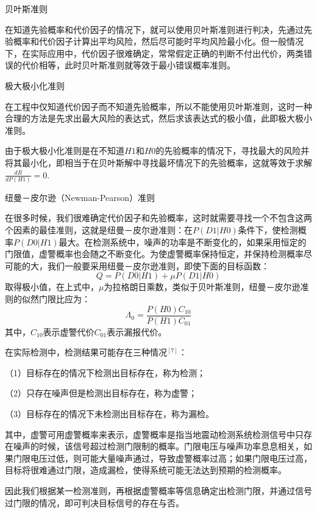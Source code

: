 \documentclass[12pt,a4paper]{article} %
\begin{document}
	\begin{compactitem} 
 			\item 贝叶斯准则
 			\par 在知道先验概率和代价因子的情况下，就可以使用贝叶斯准则进行判决，先通过先验概率和代价因子计算出平均风险，然后尽可能时平均风险最小化。但一般情况下，在实际应用中，代价因子很难确定，常常假定正确的判断不付出代价，两类错误的代价相等，此时贝叶斯准则就等效于最小错误概率准则。
			\item 极大极小化准则
			\par 在工程中仅知道代价因子而不知道先验概率，所以不能使用贝叶斯准则，这时一种合理的方法是先求出最大风险的表达式，然后求该表达式的极小值，此即极大极小准则。
			\par 由于极大极小化准则是在不知道$H1$和$H0$的先验概率的情况下，寻找最大的风险并将其最小化，即相当于在贝叶斯解中寻找最坏情况下的先验概率，这就等效于求解$\frac{dR}{dP(H1)}=0$.
			\item 纽曼－皮尔逊（Newman-Pearson）准则
			\par 在很多时候，我们很难确定代价因子和先验概率，这时就需要寻找一个不包含这两个因素的最佳准则，这就是纽曼－皮尔逊准则：在$P(D1|H0)$条件下，使检测概率$P(D0|H1)$最大。在检测系统中，噪声的功率是不断变化的，如果采用恒定的门限值，虚警概率也会随之不断变化。为使虚警概率保持恒定，并保持检测概率尽可能的大，我们一般要采用纽曼－皮尔逊准则，即使下面的目标函数：
			\begin{equation}
	Q = P(D0|H1)+\mu P(D1|H0)
	\end{equation}
取得极小值，在上式中，$\mu$为拉格朗日乘数，类似于贝叶斯准则，纽曼－皮尔逊准则的似然门限比应为：
  \begin{equation}
	\Lambda_0 = \frac {P(H0)C_{10}}{P(H1)C_{01}}
	\end{equation}
	其中，$C_{10}$表示虚警代价$C_{01}$表示漏报代价。

		 \end{compactitem}	
	在实际检测中，检测结果可能存在三种情况$^{[7]}$：
	\par （1）目标存在的情况下检测出目标存在，称为检测；
	\par （2）只存在噪声但是检测出目标存在，称为虚警；
	\par （3）目标存在的情况下未检测出目标存在，称为漏检。
	\par 其中，虚警可用虚警概率来表示，虚警概率是指当地震动检测系统检测信号中只存在噪声的时候，该信号超过检测门限制的概率。门限电压与噪声功率息息相关，如果门限电压过低，则可能大量噪声通过，导致虚警概率过高；如果门限电压过高，目标将很难通过门限，造成漏检，使得系统可能无法达到预期的检测概率。
	\par 因此我们根据某一检测准则，再根据虚警概率等信息确定出检测门限，并通过信号过门限的情况，即可判决目标信号的存在与否。
	
\end{document}

